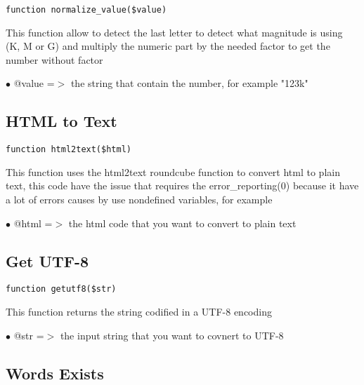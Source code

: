 \documentclass[a4paper]{book}
\begin{document}
\begin{lstlisting}
function normalize_value($value)
\end{lstlisting}

This function allow to detect the last letter to detect what magnitude is
using (K, M or G) and multiply the numeric part by the needed factor to
get the number without factor

\begin{compactitem}
\item[\color{myblue}$\bullet$] @value =$>$ the string that contain the number, for example "123k"
\end{compactitem}

\hypertarget{toc258}{}
\subsection{HTML to Text}

\begin{lstlisting}
function html2text($html)
\end{lstlisting}

This function uses the html2text roundcube function to convert html to
plain text, this code have the issue that requires the error\_reporting(0)
because it have a lot of errors causes by use nondefined variables, for
example

\begin{compactitem}
\item[\color{myblue}$\bullet$] @html =$>$ the html code that you want to convert to plain text
\end{compactitem}

\hypertarget{toc259}{}
\subsection{Get UTF-8}

\begin{lstlisting}
function getutf8($str)
\end{lstlisting}

This function returns the string codified in a UTF-8 encoding

\begin{compactitem}
\item[\color{myblue}$\bullet$] @str =$>$ the input string that you want to covnert to UTF-8
\end{compactitem}

\hypertarget{toc260}{}
\subsection{Words Exists}
\end{document}
